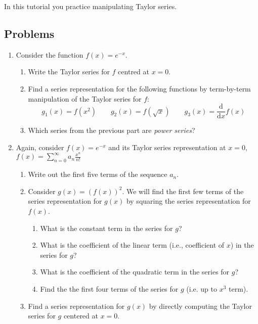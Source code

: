 		\begin{objectives}
			In this tutorial you practice manipulating Taylor series.
		\end{objectives}

\subsection*{Problems}




\begin{enumerate}
    \item Consider the function $f(x)=e^{-x}$. 
    
    \begin{enumerate}
        \item Write the Taylor series for $f$ centred at $x=0$.
        \item Find a series representation for the following functions by term-by-term manipulation of the Taylor series for $f$:
        \[
            g_1(x)=f(x^2)\qquad g_2(x)=f(\sqrt{x})\qquad g_3(x)=\frac{\mathrm d}{\mathrm d x}f(x)
        \]
        \item Which series from the previous part are \emph{power series}?

    \end{enumerate}

    \item Again, consider $f(x)=e^{-x}$ and its Taylor series representation at $x=0$,
    $\displaystyle f(x)= \sum_{n=0}^\infty a_n \frac{x^n}{n!}$
    \begin{enumerate}
        \item Write out the first five terms of the sequence $a_n$.
        \item Consider $g(x)=(f(x))^2$.  We will find the first few terms of the series representation for $g(x)$ by squaring the series representation for $f(x)$. 
        \begin{enumerate}
            \item What is the constant term in the series for $g$?
            \item What is the coefficient of the linear term (i.e., coefficient of $x$) in the series for $g$?
            \item What is the coefficient of the quadratic term in the series for $g$?
            \item Find the the first four terms of the series for $g$ (i.e. up to $x^3$ term).
        \end{enumerate}
        \item Find a series representation for $g(x)$ by directly computing the Taylor series for $g$ centered at $x=0$.


\end{enumerate}
\end{enumerate}
